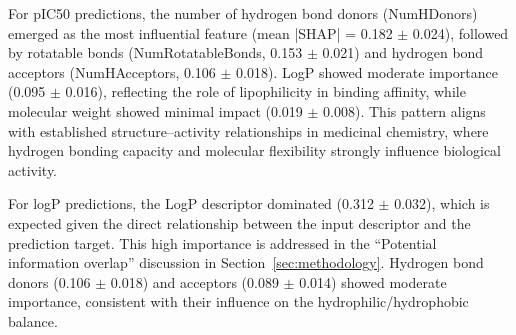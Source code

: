 \documentclass[preprint,12pt]{elsarticle}
\renewcommand{\arraystretch}{1.1}
\begin{document}
\begin{table}[H]
\centering
\caption{SHAP Feature Importance Analysis for Model Input Features}
\label{tab:shap_importance}

 \renewcommand{\arraystretch}{1.3}

\end{table}


For pIC50 predictions, the number of hydrogen bond donors (NumHDonors) emerged as the most influential feature (mean |SHAP| = 0.182 $\pm$ 0.024), followed by rotatable bonds (NumRotatableBonds, 0.153 $\pm$ 0.021) and hydrogen bond acceptors (NumHAcceptors, 0.106 $\pm$ 0.018). LogP showed moderate importance (0.095 $\pm$ 0.016), reflecting the role of lipophilicity in binding affinity, while molecular weight showed minimal impact (0.019 $\pm$ 0.008). This pattern aligns with established structure--activity relationships in medicinal chemistry, where hydrogen bonding capacity and molecular flexibility strongly influence biological activity.

For logP predictions, the LogP descriptor dominated (0.312 $\pm$ 0.032), which is expected given the direct relationship between the input descriptor and the prediction target. This high importance is addressed in the ``Potential information overlap'' discussion in Section~\ref{sec:methodology}. Hydrogen bond donors (0.106 $\pm$ 0.018) and acceptors (0.089 $\pm$ 0.014) showed moderate importance, consistent with their influence on the hydrophilic/hydrophobic balance.
\end{document}
